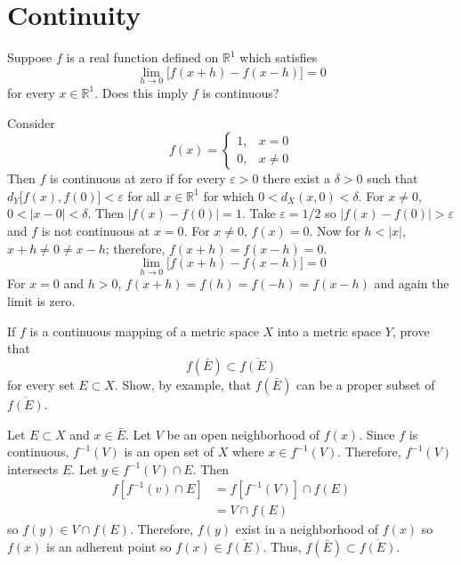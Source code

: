 \chapter{Continuity}
\label{ch4}

\begin{exercise}
\item
  Suppose \(f\) is a real function defined on \(\mathbb{R}^1\) which satisfies
  \[
  \lim_{h\to 0}\bigl[f(x + h) - f(x - h)\bigr] = 0
  \]
  for every \(x\in\mathbb{R}^1\).
  Does this imply \(f\) is continuous?
  \par\smallskip
  Consider
  \[
  f(x) =
  \begin{cases}
    1, & x = 0\\
    0, & x\neq 0
  \end{cases}
  \]
  Then \(f\) is continuous at zero if for every \(\varepsilon > 0\) there exist a
  \(\delta > 0\) such that \(d_Y\bigl[f(x),f(0)\bigr] < \varepsilon\) for all
  \(x\in\mathbb{R}^1\) for which \(0 < d_X(x,0) < \delta\).
  For \(x\neq 0\), \(0 < \lvert x - 0\rvert < \delta\).
  Then \(\lvert f(x) - f(0)\rvert = 1\).
  Take \(\varepsilon = 1/2\) so \(\lvert f(x) - f(0)\rvert > \varepsilon\) and \(f\)
  is not continuous at \(x = 0\).
  For \(x\neq 0\), \(f(x) = 0\).
  Now for \(h < \lvert x\rvert\), \(x + h\neq 0\neq x - h\); therefore,
  \(f(x + h) = f(x - h) = 0\).
  \[
  \lim_{h\to 0}\bigl[f(x + h) - f(x - h)\bigr] = 0
  \]
  For \(x = 0\) and \(h > 0\), \(f(x + h) = f(h) = f(-h) = f(x - h)\) and again
  the limit is zero.
\item
  If \(f\) is a continuous mapping of a metric space \(X\) into a metric space
  \(Y\), prove that
  \[
  f(\bar{E})\subset\overline{f(E)}
  \]
  for every set \(E\subset X\).
  Show, by example, that \(f(\bar{E})\) can be a proper subset of
  \(\overline{f(E)}\).
  \par\smallskip
  Let \(E\subset X\) and \(x\in\bar{E}\).
  Let \(V\) be an open neighborhood of \(f(x)\).
  Since \(f\) is continuous, \(f^{-1}(V)\) is an open set of \(X\) where
  \(x\in f^{-1}(V)\).
  Therefore, \(f^{-1}(V)\) intersects \(E\).
  Let \(y\in f^{-1}(V)\cap E\).
  Then
  \begin{align*}
    f[f^{-1}(v)\cap E] & = f[f^{-1}(V)]\cap f(E)\\
                       & = V\cap f(E)
  \end{align*}
  so \(f(y)\in V\cap f(E)\).
  Therefore, \(f(y)\) exist in a neighborhood of \(f(x)\) so \(f(x)\) is an
  adherent point so \(f(x)\in\overline{f(E)}\).
  Thus, \(f(\bar{E})\subset\overline{f(E)}\).

\end{exercise}
